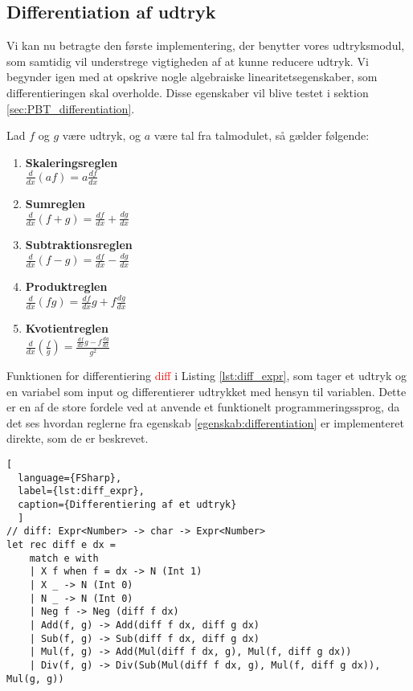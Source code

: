 \subsection{Differentiation af udtryk}
Vi kan nu betragte den første implementering, der benytter vores udtryksmodul, som samtidig vil understrege vigtigheden af at kunne reducere udtryk. Vi begynder igen med at opskrive nogle algebraiske linearitetsegenskaber, som differentieringen skal overholde. Disse egenskaber vil blive testet i sektion \ref{sec:PBT_differentiation}.
\vspace{0.5cm}
\begin{egenskab}\label{egenskab:differentiation}
  Lad $f$ og $g$ være udtryk, og $a$ være tal fra talmodulet, så gælder følgende:
  \begin{enumerate}
    \item \textbf{Skaleringsreglen} \\
    \(\frac{d}{dx}(af) = a\frac{df}{dx}\)
    \item \textbf{Sumreglen} \\
    \(\frac{d}{dx}(f+g) = \frac{df}{dx} + \frac{dg}{dx}\)
    \item \textbf{Subtraktionsreglen} \\
    \(\frac{d}{dx}(f-g) = \frac{df}{dx} - \frac{dg}{dx}\)
    \item \textbf{Produktreglen} \\
    \(\frac{d}{dx}(fg) = \frac{df}{dx}g + f\frac{dg}{dx}\)
    \item \textbf{Kvotientreglen} \\
    \(\frac{d}{dx}\left(\frac{f}{g}\right) = \frac{\frac{df}{dx}g - f\frac{dg}{dx}}{g^2}\)
  \end{enumerate}
\end{egenskab}

Funktionen for differentiering \textcolor{red}{diff} i Listing \ref{lst:diff_expr}, som tager et udtryk og en variabel som input og differentierer udtrykket med hensyn til variablen. Dette er en af de store fordele ved at anvende et funktionelt programmeringssprog, da det ses hvordan reglerne fra egenskab \ref{egenskab:differentiation} er implementeret direkte, som de er beskrevet.

\begin{lstlisting}[
  language={FSharp}, 
  label={lst:diff_expr}, 
  caption={Differentiering af et udtryk}
  ]
// diff: Expr<Number> -> char -> Expr<Number>
let rec diff e dx = 
    match e with
    | X f when f = dx -> N (Int 1)
    | X _ -> N (Int 0)
    | N _ -> N (Int 0)
    | Neg f -> Neg (diff f dx)
    | Add(f, g) -> Add(diff f dx, diff g dx)
    | Sub(f, g) -> Sub(diff f dx, diff g dx)
    | Mul(f, g) -> Add(Mul(diff f dx, g), Mul(f, diff g dx))
    | Div(f, g) -> Div(Sub(Mul(diff f dx, g), Mul(f, diff g dx)), Mul(g, g))
\end{lstlisting}

